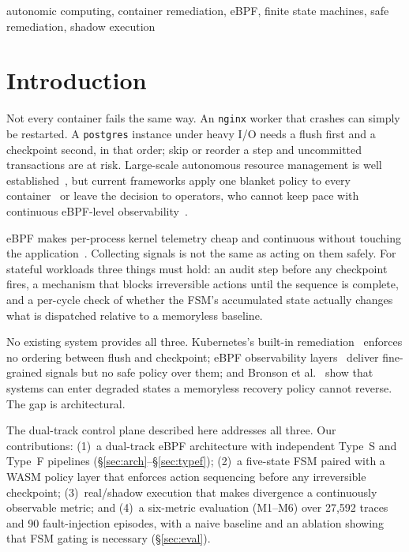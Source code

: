 \documentclass[conference]{IEEEtran}
\begin{document}
\begin{IEEEkeywords}
autonomic computing, container remediation, eBPF, finite state machines, safe remediation, shadow execution
\end{IEEEkeywords}

\section{Introduction}
\label{sec:intro}

Not every container fails the same way. An \texttt{nginx} worker that crashes can simply be restarted. A \texttt{postgres} instance under heavy I/O needs a flush first and a checkpoint second, in that order; skip or reorder a step and uncommitted transactions are at risk. Large-scale autonomous resource management is well established~\cite{b14}, but current frameworks apply one blanket policy to every container~\cite{b1} or leave the decision to operators, who cannot keep pace with continuous eBPF-level observability~\cite{b6}.

eBPF makes per-process kernel telemetry cheap and continuous without touching the application~\cite{b6}. Collecting signals is not the same as acting on them safely. For stateful workloads three things must hold: an audit step before any checkpoint fires, a mechanism that blocks irreversible actions until the sequence is complete, and a per-cycle check of whether the FSM's accumulated state actually changes what is dispatched relative to a memoryless baseline.

No existing system provides all three. Kubernetes's built-in remediation~\cite{b1} enforces no ordering between flush and checkpoint; eBPF observability layers~\cite{b6} deliver fine-grained signals but no safe policy over them; and Bronson et al.~\cite{b15} show that systems can enter degraded states a memoryless recovery policy cannot reverse. The gap is architectural.

The dual-track control plane described here addresses all three. Our contributions: (1)~a dual-track eBPF architecture with independent Type~S and Type~F pipelines (\S\ref{sec:arch}--\S\ref{sec:typef}); (2)~a five-state FSM paired with a WASM policy layer that enforces action sequencing before any irreversible checkpoint; (3)~real/shadow execution that makes divergence a continuously observable metric; and (4)~a six-metric evaluation (M1--M6) over 27,592 traces and 90 fault-injection episodes, with a naive baseline and an ablation showing that FSM gating is necessary (\S\ref{sec:eval}).
\end{document}
